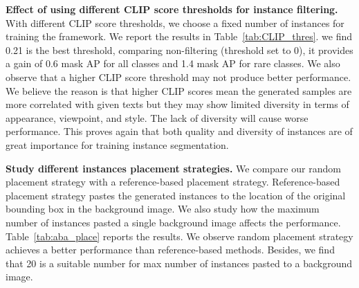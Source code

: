 \documentclass{article}
\begin{document}
\begin{table*}[t]
  \small
  \centering
\caption{Comparision with previous methods on LVIS 1.0 validation set. }
\label{tab:LVIS1}
\end{table*}

\noindent \textbf{Effect of using different CLIP score thresholds for instance filtering. }
With different CLIP score thresholds, we choose a fixed number of instances for training the framework. We report the results in Table~\ref{tab:CLIP_thres}. we find 0.21 is the best threshold, comparing non-filtering (threshold set to 0), it provides a gain of 0.6 mask AP for all classes and 1.4 mask AP for rare classes. We also observe that a higher CLIP score threshold may not produce better performance. We believe the reason is that higher CLIP scores mean the generated samples are more correlated with given texts but they may show limited diversity in terms of appearance, viewpoint, and style. The lack of diversity will cause worse performance. This proves again that both quality and diversity of instances are of great importance for training instance segmentation.


\noindent \textbf{Study different instances placement strategies.} We compare our random placement strategy with a reference-based placement strategy. Reference-based placement strategy pastes the generated instances to the location of the original bounding box in the background image. We also study how the maximum number of instances  pasted a single background image affects the performance. Table~\ref{tab:aba_place} reports the results. We observe random placement strategy achieves a better performance than reference-based methods. Besides, we find that 20 is a suitable number for max number of instances pasted to a background image. 
\end{document}
